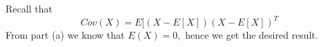 \begin{answer}
    Recall that
    $$ Cov(X) = E[(X - E[X])(X - E[X])^T $$
 From part (a) we know that $E(X) = 0,$ hence we get the desired result.
    
\end{answer}
